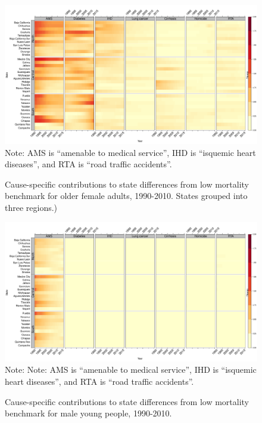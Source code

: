 \documentclass[11.5pt]{article}
\begin{document}
{\begin{figure}[h!]
\centering
\caption{Cause-specific contributions to state differences from low mortality benchmark for older female adults, 1990-2010. States grouped into three regions.)}
\label{fig:e40_74_females}
\includegraphics[scale=.31]{Adult_Female_heatmap.pdf}
Note: AMS is ``amenable to medical service'', IHD is ``isquemic heart diseases'', and RTA is ``road traffic accidents''. \end{figure}


\begin{figure}
\centering
\caption{Cause-specific contributions to state differences from low mortality benchmark for male young people, 1990-2010.}
\label{fig:e0_14_males}
\includegraphics[scale=.3]{Young_Male_heatmap.pdf}
Note: Note: AMS is ``amenable to medical service'', IHD is ``isquemic heart diseases'', and RTA is ``road traffic accidents''.  \end{figure}

}
\end{document}
